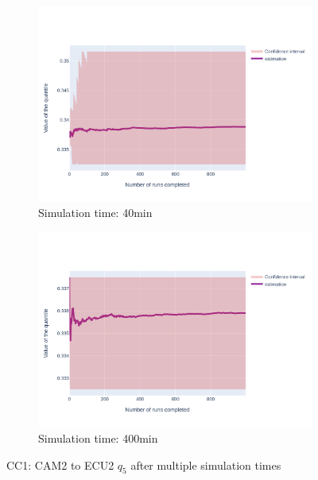 \documentclass{article}
\begin{document}
\begin{figure}[H]
\begin{subfigure}{.495\textwidth}
        \vspace{.5cm}
    \end{subfigure}
    \begin{subfigure}{.495\textwidth}
        \centering
        \includegraphics[width=\textwidth]{../fig/quantile5/CC1: CAM2 --> ECU2_40mn.png}
        \caption{Simulation time: 40min}
    \end{subfigure}
    \begin{subfigure}{.495\textwidth}
        \centering
        \includegraphics[width=\textwidth]{../fig/quantile5/CC1: CAM2 --> ECU2_400mn.png}
        \caption{Simulation time: 400min}
    \end{subfigure}
    \caption{CC1: CAM2 to ECU2 $q_5$ after multiple simulation times}
\end{figure}
\end{document}
